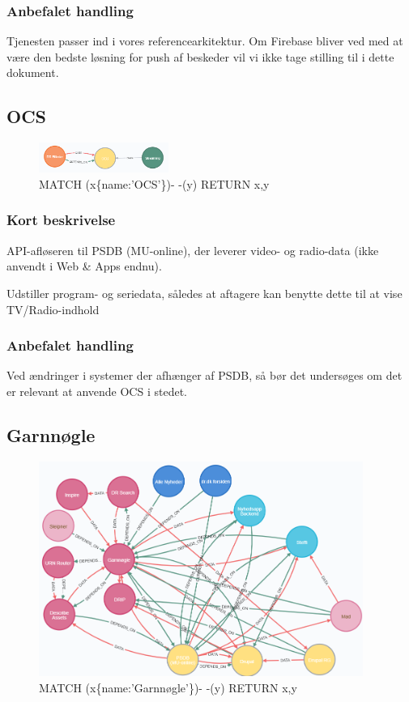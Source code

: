 \documentclass{article}
\begin{document}
\subsubsection*{Anbefalet handling}
Tjenesten passer ind i vores referencearkitektur. Om Firebase bliver ved med at være den bedste løsning for push af beskeder vil vi ikke tage stilling til i dette dokument.


\subsection{OCS}
\begin{figure}[h]
\includegraphics[width=120pt]{OCS.PNG}
\caption{MATCH (x\{name:'OCS'\})- -(y) RETURN x,y}
\end{figure}
\subsubsection*{Kort beskrivelse}
API-afløseren til PSDB (MU-online), der leverer video- og radio-data (ikke anvendt i Web \& Apps endnu).

Udstiller program- og seriedata, således at aftagere kan benytte dette til at vise TV/Radio-indhold
\subsubsection*{Anbefalet handling}
Ved ændringer i systemer der afhænger af PSDB, så bør det undersøges om det er relevant at anvende OCS i stedet.



\subsection{Garnnøgle}
\begin{figure}[h]
\includegraphics[width=300pt]{Garnnoegle.PNG}
\caption{MATCH (x\{name:'Garnnøgle'\})- -(y) RETURN x,y}
\end{figure}
\end{document}
